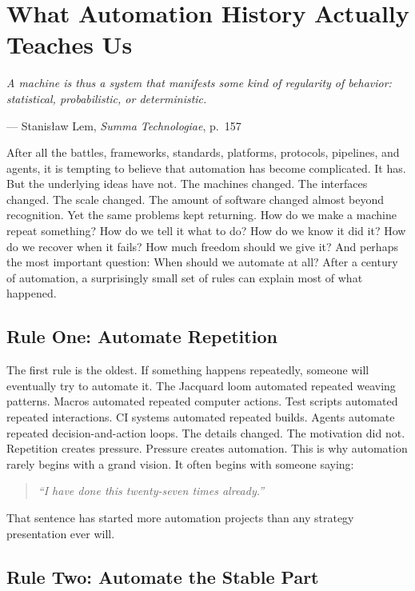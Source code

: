 \documentclass[11pt,twoside]{book}
\providecommand{\epigraphlem}[2]{%
  \begin{flushright}\begin{minipage}{0.72\textwidth}\raggedleft
  \itshape #1\par\vspace{0.4em}\normalfont\small --- #2
  \end{minipage}\end{flushright}\vspace{1.2em}}
\begin{document}
\chapter{What Automation History Actually Teaches Us}

\epigraphlem{A machine is thus a system that manifests some kind of regularity of behavior: statistical, probabilistic, or deterministic.}{Stanisław Lem, \textit{Summa Technologiae}, p.~157}


After all the battles, frameworks, standards, platforms, protocols, pipelines, and agents, it is tempting to believe that automation has become complicated.
It has.
But the underlying ideas have not.
The machines changed.
The interfaces changed.
The scale changed.
The amount of software changed almost beyond recognition.
Yet the same problems kept returning.
How do we make a machine repeat something?
How do we tell it what to do?
How do we know it did it?
How do we recover when it fails?
How much freedom should we give it?
And perhaps the most important question:
When should we automate at all?
After a century of automation, a surprisingly small set of rules can explain most of what happened.

\section*{Rule One: Automate Repetition}

The first rule is the oldest.
If something happens repeatedly, someone will eventually try to automate it.
The Jacquard loom automated repeated weaving patterns.
Macros automated repeated computer actions.
Test scripts automated repeated interactions.
CI systems automated repeated builds.
Agents automate repeated decision-and-action loops.
The details changed.
The motivation did not.
Repetition creates pressure.
Pressure creates automation.
This is why automation rarely begins with a grand vision.
It often begins with someone saying:
\begin{quote}
\emph{``I have done this twenty-seven times already.''}
\end{quote}
That sentence has started more automation projects than any strategy presentation ever will.

\section*{Rule Two: Automate the Stable Part}
\end{document}

